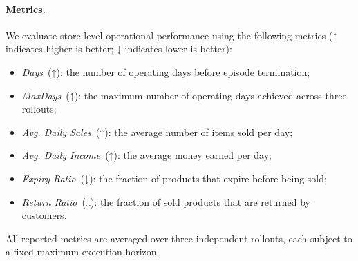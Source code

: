 \paragraph{Metrics.}
We evaluate store-level operational performance using the following metrics (↑ indicates higher is better; ↓ indicates lower is better):
\begin{itemize}[leftmargin=*]
    \item \textit{Days}~(↑): the number of operating days before episode termination;
    \item \textit{MaxDays}~(↑): the maximum number of operating days achieved across three rollouts;
    \item \textit{Avg. Daily Sales}~(↑): the average number of items sold per day;
    \item \textit{Avg. Daily Income}~(↑): the average money earned per day;
    \item \textit{Expiry Ratio}~(↓): the fraction of products that expire before being sold;
    \item \textit{Return Ratio}~(↓): the fraction of sold products that are returned by customers.
\end{itemize}

All reported metrics are averaged over three independent rollouts, each subject to a fixed maximum execution horizon.








